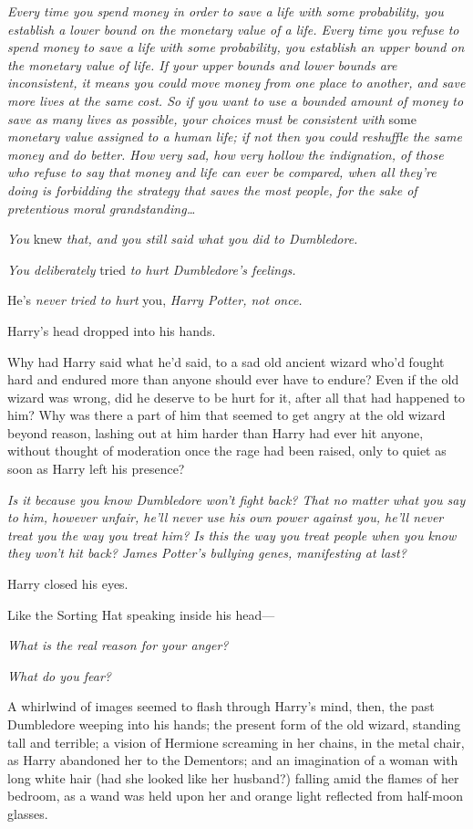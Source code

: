 \emph{Every time you spend money in order to save a life with some probability, 
you establish a lower bound on the monetary value of a life. Every time you 
refuse to spend money to save a life with some probability, you establish an 
upper bound on the monetary value of life. If your upper bounds and lower 
bounds are inconsistent, it means you could move money from one place to 
another, and save more lives at the same cost. So if you want to use a bounded 
amount of money to save as many lives as possible, your choices must be 
consistent with} some\emph{ monetary value assigned to a human life; if not 
then you could reshuffle the same money and do better. How very sad, how very 
hollow the indignation, of those who refuse to say that money and life can ever 
be compared, when all they're doing is forbidding the strategy that saves the 
most people, for the sake of pretentious moral grandstanding{\ldots}}

\emph{You} knew\emph{ that, and you still said what you did to Dumbledore.}

\emph{You deliberately} tried\emph{ to hurt Dumbledore's feelings.}

He's\emph{ never tried to hurt} you,\emph{ Harry Potter, not once.} 

Harry's head dropped into his hands.

Why had Harry said what he'd said, to a sad old ancient wizard who'd fought 
hard and endured more than anyone should ever have to endure? Even if the old 
wizard was wrong, did he deserve to be hurt for it, after all that had happened 
to him? Why was there a part of him that seemed to get angry at the old wizard 
beyond reason, lashing out at him harder than Harry had ever hit anyone, 
without thought of moderation once the rage had been raised, only to quiet as 
soon as Harry left his presence?

\emph{Is it because you know Dumbledore won't fight back? That no matter what 
you say to him, however unfair, he'll never use his own power against you, 
he'll never treat you the way you treat him? Is this the way you treat people 
when you know they won't hit back? James Potter's bullying genes, manifesting 
at last?}

Harry closed his eyes.

Like the Sorting Hat speaking inside his head---

\emph{What is the real reason for your anger?}

\emph{What do you fear?}

A whirlwind of images seemed to flash through Harry's mind, then, the past 
Dumbledore weeping into his hands; the present form of the old wizard, standing 
tall and terrible; a vision of Hermione screaming in her chains, in the metal 
chair, as Harry abandoned her to the Dementors; and an imagination of a woman 
with long white hair (had she looked like her husband?) falling amid the flames 
of her bedroom, as a wand was held upon her and orange light reflected from 
half-moon glasses.

